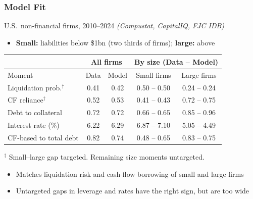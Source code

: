 \documentclass[aspectratio=169,xcolor=table]{beamer}
\begin{document}
\begin{frame}[label=ModelFit] \frametitle{Model Fit \hfill \hyperlink{Calibration}{}}

U.S.\ non-financial firms, 2010--2024 \footnotesize \textit{(Compustat, CapitalIQ, FJC IDB)} \normalsize
\begin{itemize} \small
    \item \textbf{Small:} liabilities below \$1bn (two thirds of firms); \textbf{large:} above \hfill \hyperlink{targets}{}
\end{itemize} \vspace{1mm}

\footnotesize
\begin{table}[h!]
\centering
\renewcommand{\arraystretch}{0.9}
\begin{tabular}{l|cc||cc}
& \multicolumn{2}{c||}{\textbf{All firms}} & \multicolumn{2}{c}{\textbf{By size} \scriptsize (Data -- \textcolor{primary}{Model})} \\
\toprule
Moment & Data & Model & Small firms & Large firms \\
\midrule
Liquidation prob.$^\dagger$  & 0.41 & \textcolor{primary}{0.42} & 0.50 -- \textcolor{primary}{0.50} & 0.24 -- \textcolor{primary}{0.24} \\
CF reliance$^\dagger$        & 0.52 & \textcolor{primary}{0.53} & 0.41 -- \textcolor{primary}{0.43} & 0.72 -- \textcolor{primary}{0.75} \\
\midrule
Debt to collateral          & 0.72 & \textcolor{primary}{0.72} & 0.66 -- \textcolor{primary}{0.65} & 0.85 -- \textcolor{primary}{0.96} \\
Interest rate (\%)          & 6.22 & \textcolor{primary}{6.29} & 6.87 -- \textcolor{primary}{7.10} & 5.05 -- \textcolor{primary}{4.49} \\
CF-based to total debt      & 0.82 & \textcolor{primary}{0.74} & 0.48 -- \textcolor{primary}{0.65} & 0.83 -- \textcolor{primary}{0.75} \\
\bottomrule
\end{tabular}
\end{table}
\vspace{-2mm}
\scriptsize $^\dagger$ Small--large gap targeted. Remaining size moments untargeted. \normalsize \vspace{2mm}

\begin{itemize} \small
    \item Matches liquidation risk and cash-flow borrowing of small and large firms
    \item Untargeted gaps in leverage and rates have the right sign, but are too wide
\end{itemize}

\end{frame}
\end{document}
